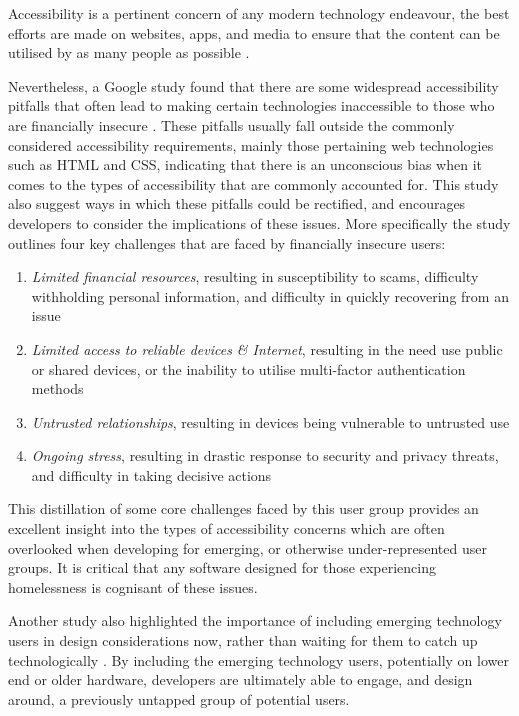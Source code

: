 Accessibility is a pertinent concern of any modern technology endeavour, the best efforts are made on websites, apps, and media to ensure that the content can be utilised by as many people as possible \cite{henry2014accessibility} \cite{brophy2007web}.

Nevertheless, a Google study found that there are some widespread accessibility pitfalls that often lead to making certain technologies inaccessible to those who are financially insecure \cite{sleeper2019tough}. These pitfalls usually fall outside the commonly considered accessibility requirements, mainly those pertaining web technologies such as HTML and CSS, indicating that there is an unconscious bias when it comes to the types of accessibility that are commonly accounted for. This study also suggest ways in which these pitfalls could be rectified, and encourages developers to consider the implications of these issues. More specifically the study outlines four key challenges that are faced by financially insecure users:

\begin{enumerate}
    \item \emph{Limited financial resources}, resulting in susceptibility to scams, difficulty withholding personal information, and difficulty in quickly recovering from an issue
    \item \emph{Limited access to reliable devices \& Internet}, resulting in the need use public or shared devices, or the inability to utilise multi-factor authentication methods
    \item \emph{Untrusted relationships}, resulting in devices being vulnerable to untrusted use
    \item \emph{Ongoing stress}, resulting in drastic response to security and privacy threats, and difficulty in taking decisive actions
\end{enumerate}

This distillation of some core challenges faced by this user group provides an excellent insight into the types of accessibility concerns which are often overlooked when developing for emerging, or otherwise under-represented user groups. It is critical that any software designed for those experiencing homelessness is cognisant of these issues.

Another study also highlighted the importance of including emerging technology users in design considerations now, rather than waiting for them to catch up technologically \cite{jones2017beyond}. By including the emerging technology users, potentially on lower end or older hardware, developers are ultimately able to engage, and design around, a previously untapped group of potential users.


